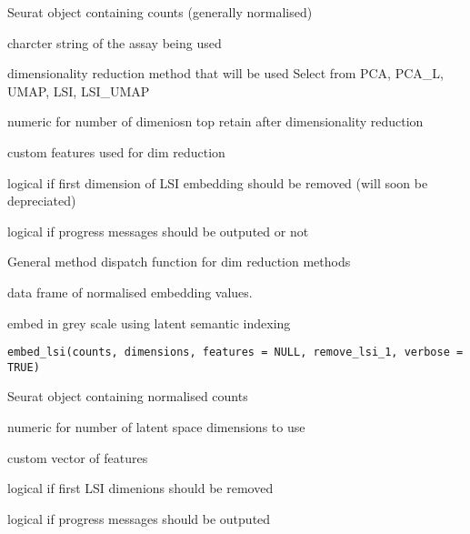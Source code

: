 \documentclass[a4paper]{book}
\begin{document}
\begin{Arguments}
\begin{ldescription}
\item[\code{counts}] Seurat object containing counts (generally normalised)

\item[\code{assay}] charcter string of the assay being used

\item[\code{dim\_reduction}] dimensionality reduction method that will be used
Select from PCA, PCA\_L, UMAP, LSI, LSI\_UMAP

\item[\code{dimensions}] numeric for number of dimeniosn top retain after 
dimensionality reduction

\item[\code{features}] custom features used for dim reduction

\item[\code{remove\_lsi\_1}] logical if first dimension of LSI embedding should be 
removed (will soon be depreciated)

\item[\code{verbose}] logical if progress messages should be outputed or not
\end{ldescription}
\end{Arguments}
%
\begin{Details}
General method dispatch function for dim reduction methods
\end{Details}
%
\begin{Value}
data frame of normalised embedding values.
\end{Value}
%
\begin{Description}
embed in grey scale using latent semantic indexing
\end{Description}
%
\begin{Usage}
\begin{verbatim}
embed_lsi(counts, dimensions, features = NULL, remove_lsi_1, verbose = TRUE)
\end{verbatim}
\end{Usage}
%
\begin{Arguments}
\begin{ldescription}
\item[\code{counts}] Seurat object containing normalised counts

\item[\code{dimensions}] numeric for number of latent space dimensions to use

\item[\code{features}] custom vector of features

\item[\code{remove\_lsi\_1}] logical if first LSI dimenions should be removed

\item[\code{verbose}] logical if progress messages should be outputed
\end{ldescription}
\end{Arguments}
\end{document}
